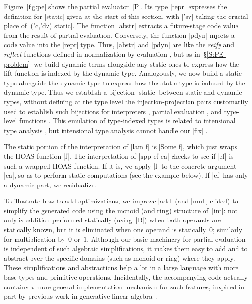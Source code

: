 Figure~\ref{fig:pe} shows the partial evaluator~|P|.
Its type |repr| expresses the definition for |static| given
at the start of this section, with |'sv| taking the crucial place of |('c,'dv) static|.
The function |abstr|
extracts a future-stage code value from the result of
partial evaluation.  Conversely, the function |pdyn| injects a
code value into the |repr| type.
Thus, |abstr| and |pdyn| are like the \emph{reify} and
\emph{reflect} functions defined in normalization by evaluation
\citep{Danvy-TDPE}, but as
in~\S\ref{S:PE-problem}, we build dynamic terms alongside
any static ones to express how the lift function is indexed
by the dynamic type.  Analogously, we now
build a static type alongside the dynamic type to express
how the static type is indexed by the dynamic type.
Thus we establish a bijection |static| between static and dynamic types,
without defining at the type level the injection\hyp projection pairs
customarily used to establish such bijections for interpreters
\citep{Ramsey-ML-module-mania,Benton-embedded-interpreters},
partial evaluation \citep{Danvy-TDPE},
and type-level functions \citep{oliveira-typecase}.
This emulation of type-indexed types is related to intensional type analysis
\citep{Morrisett-intensional,Generic-Haskell}, but
intensional type analysis cannot handle our |fix|
\citep{xi-guarded}.

The static portion of the interpretation of |lam f| is |Some f|, 
which just wraps the HOAS
function |f|. The interpretation of |app ef ea| 
checks to see if |ef| is such a wrapped
HOAS function. If it is, we apply |f| to the
concrete argument |ea|, so as to perform static
computations (see the example below). If
|ef| has only a dynamic part, we residualize.

To illustrate how to add optimizations, we improve |add| (and |mul|,
elided) to simplify the generated code using the monoid (and ring)
structure of~|int|: not only is addition performed statically
(using~|R|) when both operands are statically known, but it is
eliminated when one operand is statically~$0$; similarly for
multiplication by~$0$ or~$1$.  
Although our basic machinery for partial evaluation is independent of
such algebraic simplifications, it makes them easy to add and
to abstract over the specific domains (such as monoid or ring) where they
apply.  These simplifications and abstractions help a lot
in a large language with more base types and primitive operations.
Incidentally, the accompanying code actually contains a more general
implementation mechanism for such features, inspired in part by previous work
in generative linear algebra~\citep{CaretteKiselyov05}.

